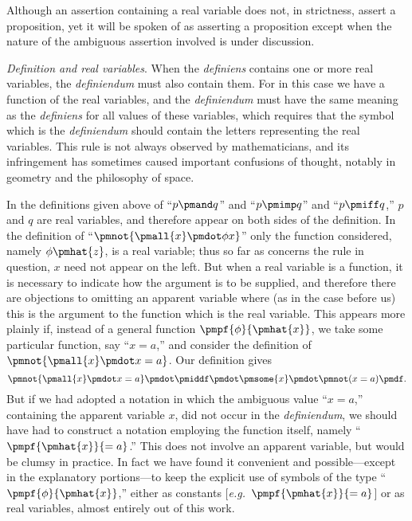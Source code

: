 \documentclass[letterpaper,12pt,openany,leqno]{book}
\newcommand{\pagefirst}[1]{\marginnote[\boxed{\text{#1}}]{\boxed{\text{#1}}}}
\begin{document}
Although an assertion containing a real variable does not, in strictness, assert a proposition, yet it will be spoken of as asserting a proposition except when the nature of the ambiguous assertion involved is under discussion.

\textit{Definition and real variables}. When the \textit{definiens} contains one or more real variables, the \textit{definiendum} must also contain them. For in this case we have a function of the real variables, and the \textit{definiendum} must have the same meaning as the \textit{definiens} for all values of these variables, which requires that the symbol which is the \textit{definiendum} should contain the letters representing the real variables. This rule is not always observed by mathematicians, and its infringement has sometimes caused important confusions of thought, notably in geometry and the philosophy of space.

In the definitions given above of ``$p \pmand q$'' and ``$p \pmimp q$'' and ``$p \pmiff q$,'' $p$ and $q$ are real variables, and therefore appear on both sides of the definition. In the definition of ``$\pmnot\{\pmall{x} \pmdot \phi x\}$'' only the function considered, namely $\phi \pmhat{z}$, is a real variable; thus so far as concerns the rule in question, $x$ need not appear on the left. But when a real variable is a function, it is necessary to indicate \pagefirst{20} how the argument is to be supplied, and therefore there are objections to omitting an apparent variable where (as in the case before us) this is the argument to the function which is the real variable. This appears more plainly if, instead of a general function $\pmpf{\phi}{\pmhat{x}}$, we take some particular function, say ``$x=a$,'' and consider the definition of $\pmnot\{\pmall{x}\pmdot x = a\}$. Our definition gives
\[
	\pmnot\{\pmall{x}\pmdot x = a\} \pmdot \pmiddf \pmdot \pmsome{x}\pmdot \pmnot (x = a) \pmdf.
\]
But if we had adopted a notation in which the ambiguous value ``$x = a$,'' containing the apparent variable $x$, did not occur in the \textit{definiendum}, we should have had to construct a notation employing the function itself, namely ``$\pmpf{\pmhat{x}}{=a}$.'' This does not involve an apparent variable, but would be clumsy in practice. In fact we have found it convenient and possible---except in the explanatory portions---to keep the explicit use of symbols of the type ``$\pmpf{\phi}{\pmhat{x}}$,'' either as constants [\textit{e.g.}\ $\pmpf{\pmhat{x}}{=a}$] or as real variables, almost entirely out of this work.
\end{document}
